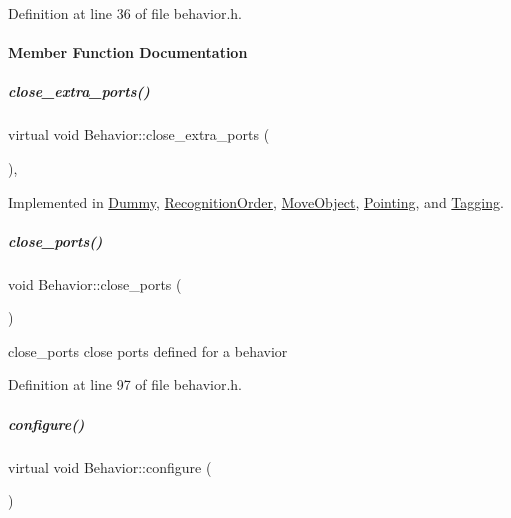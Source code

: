 Definition at line 36 of file behavior.\+h.



\paragraph{Member Function Documentation}
\mbox{\label{group__behaviorManager_affd22d1516cd32ff4f42694a1e6f9ab1}} 
\subparagraph{\texorpdfstring{close\+\_\+extra\+\_\+ports()}{close\_extra\_ports()}}
{\footnotesize\ttfamily virtual void Behavior\+::close\+\_\+extra\+\_\+ports (\begin{DoxyParamCaption}{ }\end{DoxyParamCaption})\hspace{0.3cm}{\ttfamily [protected]}, {}}



Implemented in \hyperlink{group__behaviorManager_aebfb66e2a5a0088968bf792f3adb1942}{Dummy}, \hyperlink{group__behaviorManager_aa5b70feb16d8c7b5eb883f503c96f9fa}{Recognition\+Order}, \hyperlink{group__behaviorManager_a98277199c0056a8062184b7c969da0a5}{Move\+Object}, \hyperlink{group__behaviorManager_a28ede20962e35d2ec2680f66ba371a0f}{Pointing}, and \hyperlink{group__behaviorManager_a2a90e7eda70017f01de96080c05b316c}{Tagging}.

\mbox{\label{group__behaviorManager_adf37f264e178c929b5935f546d268f34}} 
\subparagraph{\texorpdfstring{close\+\_\+ports()}{close\_ports()}}
{\footnotesize\ttfamily void Behavior\+::close\+\_\+ports (\begin{DoxyParamCaption}{ }\end{DoxyParamCaption})\hspace{0.3cm}{\ttfamily [inline]}}



close\+\_\+ports close ports defined for a behavior 



Definition at line 97 of file behavior.\+h.

\mbox{\label{group__behaviorManager_a30484d4d6de3c0689de4f60da3efbab8}} 
\subparagraph{\texorpdfstring{configure()}{configure()}}
{\footnotesize\ttfamily virtual void Behavior\+::configure (\begin{DoxyParamCaption}{ }\end{DoxyParamCaption})\hspace{0.3cm}{\ttfamily [pure virtual]}}



